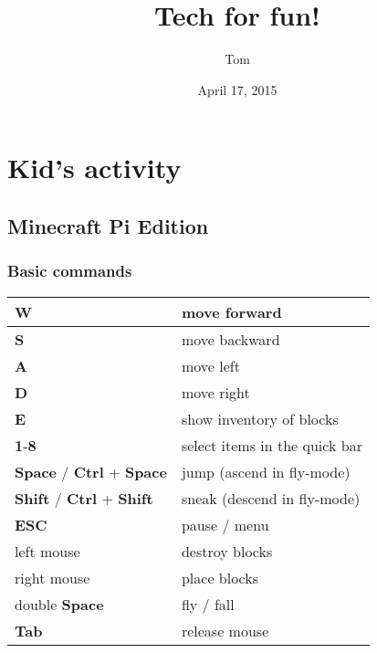 \documentclass[letterpaper,10pt,english]{sphinxmanual}
\title{Tech for fun!}
\date{April 17, 2015}
\author{Tom}
\begin{document}
\maketitle
\tableofcontents
{}\label{index::doc}



\chapter{Kid's activity}
\label{index:kid-s-activity}\label{index:tech-for-fun}

\section{Minecraft Pi Edition}
\label{kid/minecraft::doc}\label{kid/minecraft:minecraft-pi-edition}

\subsection{Basic commands}
\label{kid/minecraft:basic-commands}
\begin{tabulary}{\linewidth}{|L|L|}
\hline

\textbf{W}
 & 
move forward
\\
\hline
\textbf{S}
 & 
move backward
\\
\hline
\textbf{A}
 & 
move left
\\
\hline
\textbf{D}
 & 
move right
\\
\hline
\textbf{E}
 & 
show inventory of blocks
\\
\hline
\textbf{1}-\textbf{8}
 & 
select items in the quick bar
\\
\hline
\textbf{Space} / \textbf{Ctrl} + \textbf{Space}
 & 
jump (ascend in fly-mode)
\\
\hline
\textbf{Shift} / \textbf{Ctrl} + \textbf{Shift}
 & 
sneak (descend in fly-mode)
\\
\hline
\textbf{ESC}
 & 
pause / menu
\\
\hline
left mouse
 & 
destroy blocks
\\
\hline
right mouse
 & 
place blocks
\\
\hline
double \textbf{Space}
 & 
fly / fall
\\
\hline
\textbf{Tab}
 & 
release mouse
\\
\hline\end{tabulary}
\end{document}
